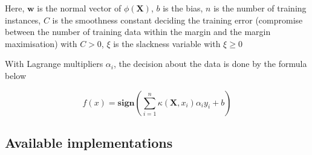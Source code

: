 \documentclass[paper=8.27in:11.69in, 11pt]{scrartcl}
\begin{document}
Here, $\mathbf{w}$ is the normal vector of $\phi(\mathbf{X})$, $b$ is the bias, $n$ is the number of training instances, $C$ is the smoothness constant deciding the training error (compromise between the number of training data within the margin and the margin maximisation) with $C > 0$, $\xi$ is the slackness variable with $\xi \geq 0$

With Lagrange multipliers $\alpha_{i}$, the decision about the data is done by the formula below 

\begin{equation}
f(x) = \textbf{sign}(\sum_{i=1}^{n}\kappa(\mathbf{X}, x_{i})\alpha_{i}y_{i}+b)
\end{equation}






\subsection{Available implementations}
\end{document}
